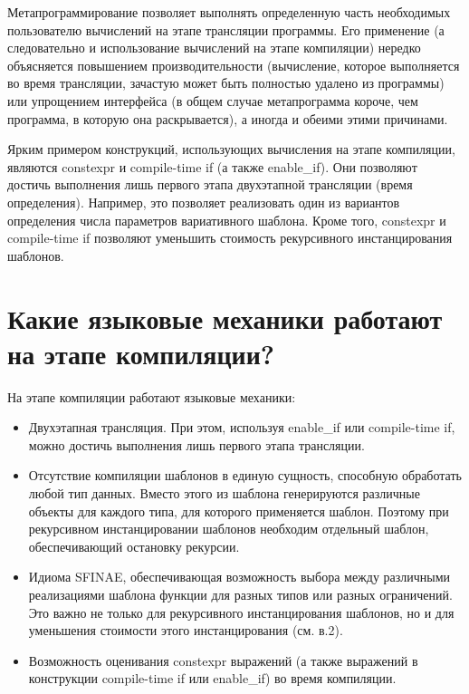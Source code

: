 \documentclass[a4paper,12pt]{article}	%
\begin{document}
	Метапрограммирование позволяет выполнять определенную часть необходимых пользователю вычислений на этапе трансляции программы. Его применение (а следовательно и использование вычислений на этапе компиляции) нередко объясняется повышением производительности (вычисление, которое выполняется во время трансляции, зачастую может быть полностью удалено из программы) или упрощением интерфейса (в общем случае метапрограмма короче, чем программа, в которую она раскрывается), а иногда и обеими этими причинами.
	
	Ярким примером конструкций, использующих вычисления на этапе компиляции, являются constexpr и compile-time if (а также enable\_if). Они позволяют достичь выполнения лишь первого этапа двухэтапной трансляции (время определения). Например, это позволяет реализовать один из вариантов определения числа параметров вариативного шаблона. Кроме того, constexpr и compile-time if позволяют уменьшить стоимость рекурсивного инстанцирования шаблонов.
	
\newpage

\section{Какие языковые механики работают на этапе компиляции?}
	
	На этапе компиляции работают языковые механики:
	
	\begin{itemize}
	
		\item Двухэтапная трансляция. При этом, используя enable\_if или compile-time if, можно достичь выполнения лишь первого этапа трансляции.
		
		\item Отсутствие компиляции шаблонов в единую сущность, способную обработать любой тип данных. Вместо этого из шаблона генерируются различные объекты для каждого типа, для которого применяется шаблон. Поэтому при рекурсивном инстанцировании шаблонов необходим отдельный шаблон, обеспечивающий остановку рекурсии.

		\item Идиома SFINAE, обеспечивающая возможность выбора между различными реализациями шаблона функции для разных типов или разных ограничений. Это важно не только для рекурсивного инстанцирования шаблонов, но и для уменьшения стоимости этого инстанцирования (см. в.2).
		
		\item Возможность оценивания constexpr выражений (а также выражений в конструкции compile-time if или enable\_if) во время компиляции.
			
	\end{itemize}
		
\end{document}
